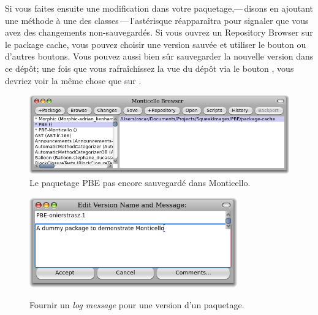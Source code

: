 \documentclass[a4paper,10pt,twoside]{book}
\begin{document}
Si vous faites ensuite une modification dans votre paquetage,---\,disons
en ajoutant une méthode à une des classes\,---\,l'astérisque réapparaîtra pour 
signaler que vous avez des changements non-sauvegardés.
Si vous ouvrez un Repository Browser sur le package cache, vous
pouvez choisir une version sauvée et utiliser le bouton 
ou d'autres boutons.
Vous pouvez aussi bien sûr sauvegarder la nouvelle version dans
ce dépôt; une fois que vous rafraîchissez la vue
du dépôt via le bouton , vous devriez voir
la même chose que sur
.

\begin{figure}[tbp]
	\begin{center}
		\includegraphics[width=\textwidth]{MC+PBE}
	\end{center}
	\caption{Le paquetage PBE pas encore sauvegardé dans Monticello.}
\end{figure}

\begin{figure}[tbp]
	\begin{center}
		{\includegraphics[width=0.8\textwidth]{PBE-on}}
	\end{center}
	\caption{Fournir un \emph{log message} pour une version d'un paquetage.}
\end{figure}
\end{document}
